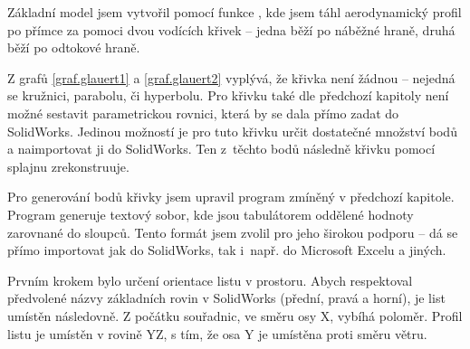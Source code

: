 	Základní model jsem vytvořil pomocí funkce , kde jsem táhl aerodynamický profil po přímce za pomoci dvou vodících křivek – jedna běží po náběžné hraně, druhá běží po odtokové hraně.
	
	Z grafů \ref{graf.glauert1} a \ref{graf.glauert2} vyplývá, že křivka není žádnou  – nejedná se kružnici, parabolu, či hyperbolu. Pro křivku také dle předchozí kapitoly není možné sestavit parametrickou rovnici, která by se dala přímo zadat do SolidWorks. Jedinou možností je pro tuto křivku určit dostatečné množství bodů a naimportovat ji do SolidWorks. Ten z~těchto bodů následně křivku pomocí splajnu zrekonstruuje.
	
	Pro generování bodů křivky jsem upravil program zmíněný v předchozí kapitole. Program generuje textový sobor, kde jsou tabulátorem oddělené hodnoty zarovnané do sloupců. Tento formát jsem zvolil pro jeho širokou podporu – dá se přímo importovat jak do SolidWorks, tak i~např. do Microsoft Excelu a jiných.
	
	Prvním krokem bylo určení orientace listu v prostoru. Abych respektoval předvolené názvy základních rovin v SolidWorks (přední, pravá a horní), je list umístěn následovně. Z počátku souřadnic, ve směru osy X, vybíhá poloměr. Profil listu je umístěn v rovině YZ, s tím, že osa Y je umístěna proti směru větru.
	
